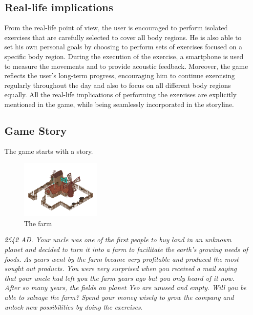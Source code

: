 \documentclass[a4paper,11pt,notitlepage]{report}
\begin{document}
\subsection{Real-life implications}
From the real-life point of view, the user is encouraged to perform isolated exercises that are carefully selected to cover all body regions. He is also able to set his own personal goals by choosing to perform sets of exercises focused on a specific body region. During the execution of the exercise, a smartphone is used to measure the movements and to provide acoustic feedback. Moreover, the game reflects the user’s long-term progress, encouraging him to continue exercising regularly throughout the day and also to focus on all different body regions equally. All the real-life implications of performing the exercises are explicitly mentioned in the game, while being seamlessly incorporated in the storyline.

\subsection{Game Story}
The game starts with a story. 
\\
\begin{figure}
  \vspace{-30pt}
	\begin{center}
		\includegraphics[width=150px]{Images/farm.png}
	\end{center}
  \vspace{-30pt}
	\caption{The farm}
  \vspace{-20pt}
	\label{fig:farm}
\end{figure}
\textit{2542 AD. Your uncle was one of the first people to buy land in an unknown planet and decided to turn it into a farm to facilitate the earth’s growing needs of foods. As years went by the farm became very profitable and produced the most sought out products. You were very surprised when you received a mail saying that your uncle had left you the farm years ago but you only heard of it now. After so many years, the fields on planet Yeo are unused and empty. Will you be able to salvage the farm? Spend your money wisely to grow the company and unlock new possibilities by doing the exercises.}
\end{document}
